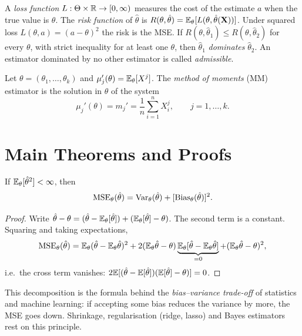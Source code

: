 \documentclass[main.tex]{subfiles}
\begin{document}
\begin{definition}\label{def:risk}
A \emph{loss function} $L:\Theta\times\mathbb{R}\to[0,\infty)$ measures the cost of the estimate $a$ when the true value is $\theta$. The \emph{risk function} of $\hat\theta$ is $R(\theta,\hat\theta)=\mathbb{E}_\theta[L(\theta,\hat\theta(\mathbf{X}))]$. Under squared loss $L(\theta,a)=(a-\theta)^2$ the risk is the MSE.
If $R(\theta,\hat\theta_1)\le R(\theta,\hat\theta_2)$ for every $\theta$, with strict inequality for at least one $\theta$, then $\hat\theta_1$ \emph{dominates} $\hat\theta_2$. An estimator dominated by no other estimator is called \emph{admissible}.
\end{definition}

\begin{definition}\label{def:momentler}
Let $\theta=(\theta_1,\dots,\theta_k)$ and $\mu_j'(\theta)=\mathbb{E}_\theta[X^j]$. The \emph{method of moments} (MM) estimator is the solution in $\theta$ of the system
\[
\mu_j'(\theta)=m_j'=\frac1n\sum_{i=1}^n X_i^j,\qquad j=1,\dots,k .
\]
\end{definition}

\section{Main Theorems and Proofs}

\begin{theorem}\label{thm:mse-ayrisim}
If $\mathbb{E}_\theta[\hat\theta^2]<\infty$, then
\[
\operatorname{MSE}_\theta(\hat{\theta}) = \operatorname{Var}_\theta(\hat{\theta}) + [\operatorname{Bias}_\theta(\hat{\theta})]^2.
\]
\end{theorem}
\begin{proof}
Write $\hat{\theta} - \theta = (\hat{\theta} - \mathbb{E}_\theta[\hat{\theta}]) + (\mathbb{E}_\theta[\hat{\theta}] - \theta)$. The second term is a constant. Squaring and taking expectations,
\[
\operatorname{MSE}_\theta(\hat\theta)=\mathbb{E}_\theta(\hat\theta-\mathbb{E}_\theta\hat\theta)^2+2(\mathbb{E}_\theta\hat\theta-\theta)\underbrace{\mathbb{E}_\theta[\hat\theta-\mathbb{E}_\theta\hat\theta]}_{=0}+(\mathbb{E}_\theta\hat\theta-\theta)^2,
\]
i.e.\ the cross term vanishes: $2\mathbb{E}[(\hat{\theta}-\mathbb{E}[\hat{\theta}])(\mathbb{E}[\hat{\theta}]-\theta)] = 0$.
\end{proof}

\begin{remark}
This decomposition is the formula behind the \emph{bias--variance trade-off} of statistics and machine learning: if accepting some bias reduces the variance by more, the MSE goes down. Shrinkage, regularisation (ridge, lasso) and Bayes estimators rest on this principle.
\end{remark}
\end{document}
